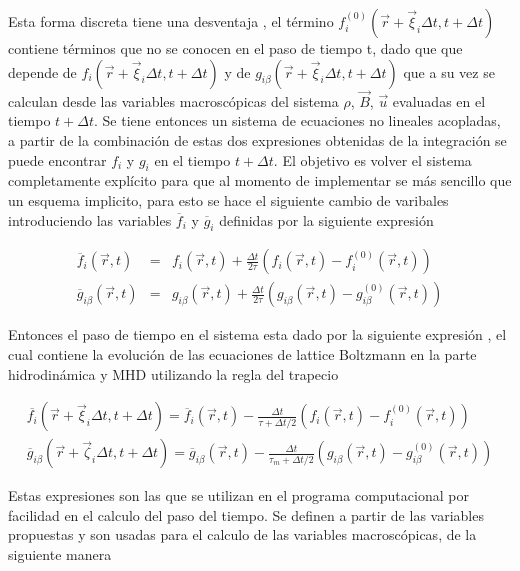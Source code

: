 \noindent Esta forma discreta tiene una desventaja , el término $f_{i}^{(0)}(\vec{r}+\vec{\xi}_{i}\Delta t,t+\Delta t)$ contiene términos que no se conocen en el paso de tiempo t, dado que que depende de $f_{i}(\vec{r}+\vec{\xi}_{i}\Delta t,t+\Delta t)$ y de $g_{i\beta}(\vec{r}+\vec{\xi}_{i}\Delta t,t+\Delta t)$ que a su vez se calculan desde las variables macroscópicas del sistema $\rho$, $\vec{B}$, $\vec{u}$ evaluadas en el tiempo $t+\Delta t$. Se tiene entonces un sistema de ecuaciones no lineales acopladas, a partir de la combinación de estas dos expresiones obtenidas de la integración se puede encontrar $f_{i}$ y $g_{i}$ en el tiempo $t+\Delta t$. El objetivo es volver el sistema completamente explícito para que al momento de implementar se más sencillo que un esquema implicito, para esto se hace el siguiente cambio de varibales introduciendo las variables $\overline{f}_{i}$ y $\overline{g}_{i}$ definidas por la siguiente expresión 

\begin{eqnarray}
    \overline{f}_{i}(\vec{r},t) &=& f_{i}(\vec{r},t) + \frac{\Delta t}{2\tau}\left(f_{i}(\vec{r},t)-f_{i}^{(0)}(\vec{r},t)\right) \\
    \overline{g}_{i\beta}(\vec{r},t) &=& g_{i\beta}(\vec{r},t) + \frac{\Delta t}{2\tau}\left(g_{i\beta}(\vec{r},t)-g_{i\beta}^{(0)}(\vec{r},t)\right)
\end{eqnarray}


Entonces el paso de tiempo en el sistema esta dado por la siguiente expresión , el cual contiene la evolución de las ecuaciones de lattice Boltzmann en la parte hidrodinámica y MHD utilizando la regla del trapecio

\begin{eqnarray}
    \overline{f_{i}}(\vec{r}+\vec{\xi}_{i}\Delta t,t+\Delta t) = \overline{f}_{i}(\vec{r},t) - \frac{\Delta t}{\tau+\Delta t/2}\left(f_{i}(\vec{r},t)-f_{i}^{(0)}(\vec{r},t)\right)\\
    \overline{g}_{i\beta}(\vec{r}+\vec{\zeta}_{i}\Delta t,t+\Delta t) = \overline{g}_{i\beta}(\vec{r},t) - \frac{\Delta t}{\tau_{m}+\Delta t/2}\left(g_{i\beta}(\vec{r},t)-g_{i\beta}^{(0)}(\vec{r},t)\right)
\end{eqnarray}

Estas expresiones son las que se utilizan en el programa computacional por facilidad en el calculo del paso del tiempo. Se definen a partir de las variables propuestas y son usadas para el calculo de las variables macroscópicas, de la siguiente manera

